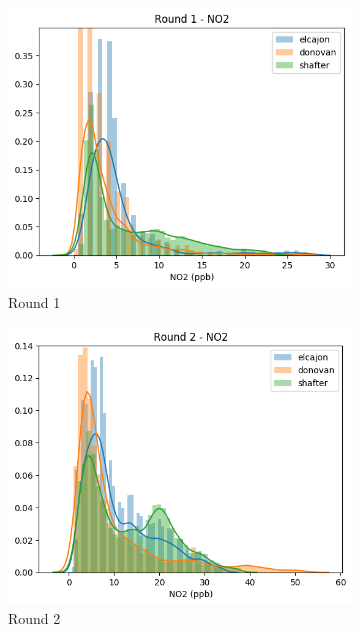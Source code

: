 \documentclass[journal abbreviation, manuscript]{copernicus}
\begin{document}
\begin{figure}[H]
\centering
\begin{subfigure}{0.32\textwidth}
\includegraphics[width=\textwidth]{results/distributions/round1_no2.png}
\caption{Round 1}
\end{subfigure}
\begin{subfigure}{0.32\textwidth}
\includegraphics[width=\textwidth]{results/distributions/round2_no2.png}
\caption{Round 2}
\end{subfigure}
\begin{subfigure}{0.32\textwidth}

\end{subfigure}
\end{figure}
\end{document}
